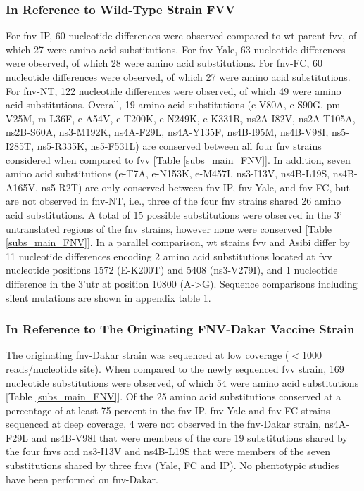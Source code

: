\subsubsection{In Reference to Wild-Type Strain FVV}
For \gls{fnv}-IP, 60 nucleotide differences were observed compared to \gls{wt} parent \gls{fvv}, of which 27 were amino acid substitutions. For \gls{fnv}-Yale, 63 nucleotide differences were observed, of which 28 were amino acid substitutions. For \gls{fnv}-FC, 60 nucleotide differences were observed, of which 27 were amino acid substitutions. For \gls{fnv}-NT, 122 nucleotide differences were observed, of which 49 were amino acid substitutions. Overall, 19 amino acid substitutions (\gls{c}-V80A, \gls{c}-S90G, \gls{pm}-V25M, \gls{m}-L36F, \gls{e}-A54V, \gls{e}-T200K, \gls{e}-N249K, \gls{e}-K331R, \gls{ns}2A-I82V, \gls{ns}2A-T105A, \gls{ns}2B-S60A, \gls{ns}3-M192K, \gls{ns}4A-F29L, \gls{ns}4A-Y135F, \gls{ns}4B-I95M, \gls{ns}4B-V98I, \gls{ns}5-I285T, \gls{ns}5-R335K, \gls{ns}5-F531L) are conserved between all four \gls{fnv} strains considered when compared to \gls{fvv} [Table \ref{subs_main_FNV}]. In addition, seven amino acid substitutions (\gls{e}-T7A, \gls{e}-N153K, \gls{e}-M457I, \gls{ns}3-I13V, \gls{ns}4B-L19S, \gls{ns}4B-A165V, \gls{ns}5-R2T) are only conserved between \gls{fnv}-IP, \gls{fnv}-Yale, and \gls{fnv}-FC, but are not observed in \gls{fnv}-NT, i.e., three of the four \gls{fnv} strains shared 26 amino acid substitutions. A total of 15 possible substitutions were observed in the 3’ untranslated regions of the \gls{fnv} strains, however none were conserved [Table \ref{subs_main_FNV}].
In a parallel comparison, \gls{wt} strains \gls{fvv} and Asibi differ by 11 nucleotide differences encoding 2 amino acid substitutions located at \gls{fvv} nucleotide positions 1572 (E-K200T) and 5408 (\gls{ns}3-V279I), and 1 nucleotide difference in the 3’\gls{utr} at position 10800 (A->G). Sequence comparisons including silent mutations are shown in appendix table 1.

\subsubsection{In Reference to The Originating FNV-Dakar Vaccine Strain}
The originating \gls{fnv}-Dakar strain was sequenced at low coverage ($<$1000 reads/nucleotide site). When compared to the newly sequenced \gls{fvv} strain, 169 nucleotide substitutions were observed, of which 54 were amino acid substitutions [Table \ref{subs_main_FNV}]. Of the 25 amino acid substitutions conserved at a percentage of at least 75 percent in the \gls{fnv}-IP, \gls{fnv}-Yale and \gls{fnv}-FC strains sequenced at deep coverage, 4 were not observed in the \gls{fnv}-Dakar strain, \gls{ns}4A-F29L and \gls{ns}4B-V98I that were members of the core 19 substitutions shared by the four \glspl{fnv} and  \gls{ns}3-I13V and \gls{ns}4B-L19S that were members of the seven substitutions shared by three \glspl{fnv} (Yale, FC and IP). No phentotypic studies have been performed on \gls{fnv}-Dakar.

